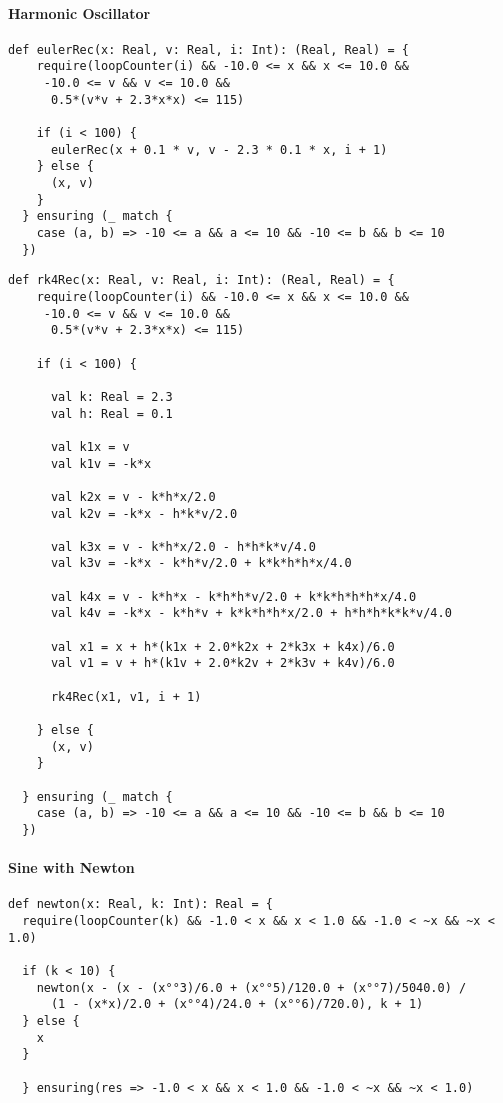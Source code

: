 \paragraph{Harmonic Oscillator}
\begin{lstlisting}
def eulerRec(x: Real, v: Real, i: Int): (Real, Real) = {
    require(loopCounter(i) && -10.0 <= x && x <= 10.0 &&
     -10.0 <= v && v <= 10.0 &&
      0.5*(v*v + 2.3*x*x) <= 115)

    if (i < 100) {
      eulerRec(x + 0.1 * v, v - 2.3 * 0.1 * x, i + 1)
    } else {
      (x, v)
    }
  } ensuring (_ match {
    case (a, b) => -10 <= a && a <= 10 && -10 <= b && b <= 10
  })
\end{lstlisting}

\begin{lstlisting}
def rk4Rec(x: Real, v: Real, i: Int): (Real, Real) = {
    require(loopCounter(i) && -10.0 <= x && x <= 10.0 &&
     -10.0 <= v && v <= 10.0 &&
      0.5*(v*v + 2.3*x*x) <= 115)

    if (i < 100) {

      val k: Real = 2.3
      val h: Real = 0.1

      val k1x = v
      val k1v = -k*x

      val k2x = v - k*h*x/2.0
      val k2v = -k*x - h*k*v/2.0

      val k3x = v - k*h*x/2.0 - h*h*k*v/4.0
      val k3v = -k*x - k*h*v/2.0 + k*k*h*h*x/4.0

      val k4x = v - k*h*x - k*h*h*v/2.0 + k*k*h*h*h*x/4.0
      val k4v = -k*x - k*h*v + k*k*h*h*x/2.0 + h*h*h*k*k*v/4.0

      val x1 = x + h*(k1x + 2.0*k2x + 2*k3x + k4x)/6.0
      val v1 = v + h*(k1v + 2.0*k2v + 2*k3v + k4v)/6.0

      rk4Rec(x1, v1, i + 1)

    } else {
      (x, v)
    }

  } ensuring (_ match {
    case (a, b) => -10 <= a && a <= 10 && -10 <= b && b <= 10
  })
\end{lstlisting}

\paragraph{Sine with Newton}
\begin{lstlisting}
def newton(x: Real, k: Int): Real = {
  require(loopCounter(k) && -1.0 < x && x < 1.0 && -1.0 < ~x && ~x < 1.0)

  if (k < 10) {
    newton(x - (x - (x°°3)/6.0 + (x°°5)/120.0 + (x°°7)/5040.0) /
      (1 - (x*x)/2.0 + (x°°4)/24.0 + (x°°6)/720.0), k + 1)
  } else {
    x
  }

  } ensuring(res => -1.0 < x && x < 1.0 && -1.0 < ~x && ~x < 1.0)
\end{lstlisting}

